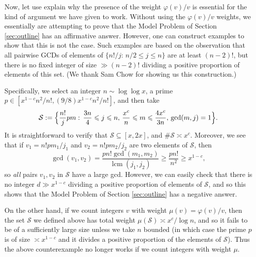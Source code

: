 \documentclass[12pt]{amsart}
\numberwithin{equation}{section}
\theoremstyle{definition}
\theoremstyle{remark}
\newcommand{\CS}{\mathcal{S}}
\DeclareMathOperator{\lcm}{lcm}
\renewcommand{\phi}{\varphi}
\renewcommand{\le}{\leqslant}
\renewcommand{\ge}{\geqslant}
\begin{document}
\medskip

Now, let use explain why the presence of the weight $\phi(v)/v$ is essential for the kind of argument we have given to work. Without using the $\phi(v)/v$ weights, we essentially are attempting to prove that the Model Problem of Section \ref{sec:outline} has an affirmative answer. However, one can construct examples to show that this is not the case. Such examples are based on the observation that all pairwise GCDs of elements of $\{n!/j:\, n/2\le j\le n\}$ are at least $(n-2)!$, but there is no fixed integer of size $\gg (n-2)!$ dividing a positive proportion of elements of this set. (We thank Sam Chow for showing us this construction.) 

Specifically, we select an integer $n\sim \log\log{x}$, a prime $p\in[x^{1-c}n^2/n!,(9/8)x^{1-c}n^2/n!]$, and then take
\[
\CS:=\Bigl\{\frac{n!}{j}p m:\,\frac{3 n}{4}\le j\le n,\,\frac{x^c}{n}\le m\le \frac{4 x^c}{3 n},\,\gcd(m,j)=1\Bigr\}.
\]
It is straightforward to verify that $\CS\subseteq[x,2x]$, and $\#\CS\asymp x^c$. Moreover, we see that if $v_1=n! p m_1/j_1$ and $v_2=n!p m_2/j_2$ are two elements of $\CS$, then
\[
\gcd(v_1,v_2)=\frac{p n!\gcd(m_1,m_2)}{\lcm(j_1,j_2)}\ge \frac{p n!}{n^2}\ge x^{1-c},
\]
so \textit{all} pairs $v_1,v_2$ in $\CS$ have a large gcd. However, we can easily check that there is no integer $d\gg x^{1-c}$ dividing a positive proportion of elements of $\CS$, and so this shows that the Model Problem of Section \ref{sec:outline} has a negative answer.

On the other hand, if we count integers $v$ with weight $\mu(v)=\phi(v)/v$, then the set $\CS$ we defined above has total weight $\mu(\CS)\asymp x^c/\log{n}$, and so it fails to be of a sufficiently large size unless we take $n$ bounded (in which case the prime $p$ is of size $\asymp x^{1-c}$ and it divides a positive proportion of the elements of $\CS$).  Thus the above counterexample no longer works if we count integers with weight $\mu$.
\end{document}
